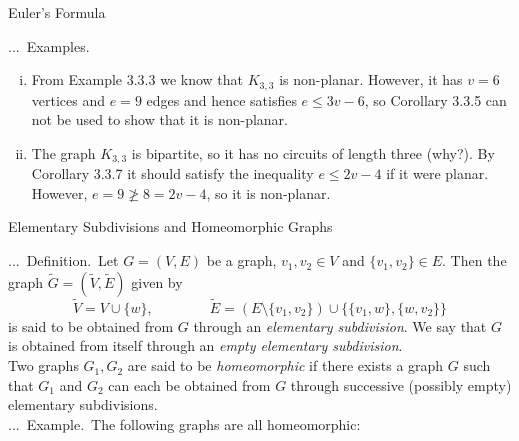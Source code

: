 \documentclass[smaller,hyperref={CJKbookmarks=true}]{beamer}
\newcounter{zhuo}[subsection]
\renewcommand{\thezhuo}{\thesection.\thesubsection.\arabic{zhuo}}
\newenvironment{DEFINITION}{\stepcounter{zhuo}\alert{\thezhuo.~Definition.\,}}{}
\newenvironment{EXAMPLE}{\stepcounter{zhuo}\alert{\!\thezhuo.~Example.\,}}{}
\newenvironment{EXAMPLES}{\stepcounter{zhuo}\alert{\!\thezhuo.~Examples.\,}}{}
\begin{document}
\begin{frame}{Euler's Formula}
\begin{spacing}{1.05}
\begin{EXAMPLES}
\begin{enumerate}[(i)]
  \item From Example 3.3.3 we know that $K_{3,3}$ is non-planar. However, it has $v=6$ vertices and $e=9$ edges and hence satisfies $e\leq 3v-6$, so Corollary 3.3.5 can not be used to show that it is non-planar.
  \item The graph $K_{3,3}$ is bipartite, so it has no circuits of length three (why?). By Corollary 3.3.7 it should satisfy the inequality $e\leq 2v-4$ if it were planar. However, $e=9\ngeq8=2v-4$, so it is non-planar.
\end{enumerate}
\end{EXAMPLES}
\end{spacing}
\end{frame}
\begin{frame}{Elementary Subdivisions and Homeomorphic Graphs}
\begin{spacing}{0.9}
\begin{DEFINITION}
Let $G=(V,E)$ be a graph, $v_1,v_2\in V$ and $\{v_1,v_2\}\in E$. Then the graph $\widetilde{G}=(\widetilde{V},\widetilde{E})$ given by
\[\widetilde{V}=V\cup\{w\},\qquad\qquad
\widetilde{E}=(E\setminus\{v_1,v_2\})\cup\big\{
\{v_1,w\},\{w,v_2\}\big\}\]
is said to be obtained from $G$ through an \emph{elementary subdivision}. We say
that $G$ is obtained from itself through an \emph{empty elementary subdivision}.\\[6pt]
Two graphs $G_1, G_2$ are said to be \emph{homeomorphic} if there exists a graph $G$
such that $G_1$ and $G_2$ can each be obtained from $G$ through successive
(possibly empty) elementary subdivisions.\\[6pt]
\begin{EXAMPLE}
The following graphs are all homeomorphic:
\begin{center}
\end{center}
\end{EXAMPLE}
\end{DEFINITION}
\end{spacing}
\end{frame}
\end{document}
